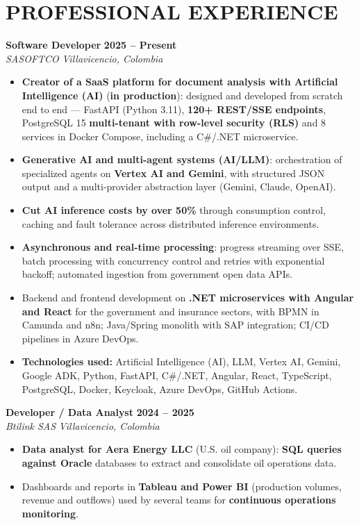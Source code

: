 \documentclass[letterpaper,10pt]{article}
\begin{document}
\section{PROFESSIONAL EXPERIENCE}

\textbf{Software Developer} \hfill \textbf{2025 -- Present} \\
\textit{SASOFTCO} \hfill \textit{Villavicencio, Colombia}
\begin{itemize}
    \item \textbf{Creator of a SaaS platform for document analysis with Artificial Intelligence (AI)} (\textbf{in production}): designed and developed from scratch end to end --- FastAPI (Python 3.11), \textbf{120+ REST/SSE endpoints}, PostgreSQL 15 \textbf{multi-tenant with row-level security (RLS)} and 8 services in Docker Compose, including a C\#/.NET microservice.
    \item \textbf{Generative AI and multi-agent systems (AI/LLM)}: orchestration of specialized agents on \textbf{Vertex AI and Gemini}, with structured JSON output and a multi-provider abstraction layer (Gemini, Claude, OpenAI).
    \item \textbf{Cut AI inference costs by over 50\%} through consumption control, caching and fault tolerance across distributed inference environments.
    \item \textbf{Asynchronous and real-time processing}: progress streaming over SSE, batch processing with concurrency control and retries with exponential backoff; automated ingestion from government open data APIs.
    \item Backend and frontend development on \textbf{.NET microservices with Angular and React} for the government and insurance sectors, with BPMN in Camunda and n8n; Java/Spring monolith with SAP integration; CI/CD pipelines in Azure DevOps.
    \item \textbf{Technologies used:} Artificial Intelligence (AI), LLM, Vertex AI, Gemini, Google ADK, Python, FastAPI, C\#/.NET, Angular, React, TypeScript, PostgreSQL, Docker, Keycloak, Azure DevOps, GitHub Actions.
\end{itemize}

\textbf{Developer / Data Analyst} \hfill \textbf{2024 -- 2025} \\
\textit{Btilink SAS} \hfill \textit{Villavicencio, Colombia}
\begin{itemize}
    \item \textbf{Data analyst for Aera Energy LLC} (U.S. oil company): \textbf{SQL queries against Oracle} databases to extract and consolidate oil operations data.
    \item Dashboards and reports in \textbf{Tableau and Power BI} (production volumes, revenue and outflows) used by several teams for \textbf{continuous operations monitoring}.
\end{itemize}
\end{document}
